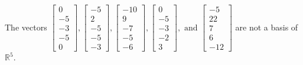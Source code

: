 \begin{exercise}
\begin{exerciseStatement}
  \end{exerciseStatement}
  \begin{exerciseAnswer}
   The vectors \(\left[\begin{array}{r}
0 \\
-5 \\
-3 \\
-5 \\
0
\end{array}\right] , \left[\begin{array}{r}
-5 \\
2 \\
-5 \\
-5 \\
-3
\end{array}\right] , \left[\begin{array}{r}
-10 \\
9 \\
-7 \\
-5 \\
-6
\end{array}\right] , \left[\begin{array}{r}
0 \\
-5 \\
-3 \\
-2 \\
3
\end{array}\right] , \text{ and } \left[\begin{array}{r}
-5 \\
22 \\
7 \\
6 \\
-12
\end{array}\right]\) 
  	 are not  a basis of \(\mathbb{R}^5\).
  


  \end{exerciseAnswer}
\end{exercise}
